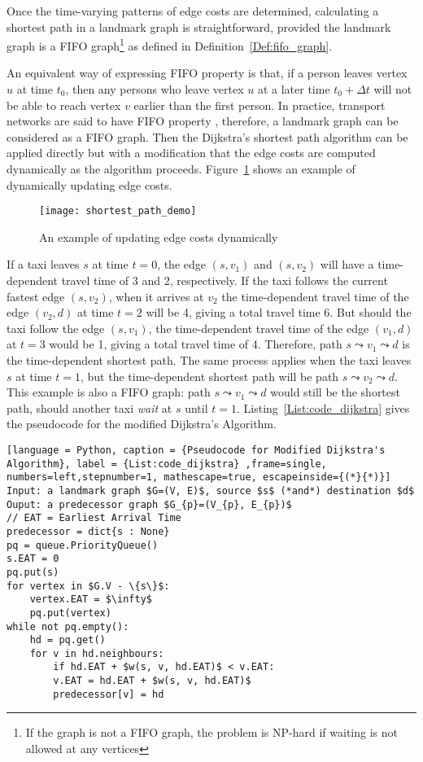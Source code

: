 Once the time-varying patterns of edge costs are determined, calculating a shortest path in a landmark graph is straightforward, provided the landmark graph is a FIFO graph\footnote{If the graph is not a FIFO graph, the problem is NP-hard if waiting is not allowed at any vertices} as defined in Definition~\ref{Def:fifo_graph}. 

An equivalent way of expressing FIFO property is that, if a person leaves vertex $u$ at time $t_{0}$, then any persons who leave vertex $u$ at a later time $t_{0} + \Delta t$ will not be able to reach vertex $v$ earlier than the first person. In practice, transport networks are said to have FIFO property \cite{TDR10}, therefore, a landmark graph can be considered as a FIFO graph. Then the Dijkstra's shortest path algorithm can be applied directly but with a modification that the edge costs are computed dynamically as the algorithm proceeds. Figure~\ref{Fig:dynamic_update} shows an example of dynamically updating edge costs. 

\begin{figure}[h!]
\texttt{[image: shortest\_path\_demo]}
\centering
\caption{An example of updating edge costs dynamically}\label{Fig:dynamic_update}
\end{figure}

If a taxi leaves $s$ at time $t = 0$, the edge $(s, v_{1})$ and $(s, v_{2})$ will have a time-dependent travel time of 3 and 2, respectively. If the taxi follows the current fastest edge $(s, v_{2})$, when it arrives at $v_{2}$ the time-dependent travel time of the edge $(v_{2}, d)$ at time $t = 2$ will be 4, giving a total travel time 6. But should the taxi follow the edge $(s, v_{1})$, the time-dependent travel time of the edge $(v_{1}, d)$ at $t = 3$ would be 1, giving a total travel time of 4. Therefore, path $s \leadsto v_{1} \leadsto d$ is the time-dependent shortest path. The same process applies when the taxi leaves $s$ at time $t = 1$, but the time-dependent shortest path will be path $s \leadsto v_{2} \leadsto d$. This example is also a FIFO graph: path $s \leadsto v_{1} \leadsto d$ would still be the shortest path, should another taxi \emph{wait} at $s$ until $t = 1$. Listing~\ref{List:code_dijkstra} gives the pseudocode for the modified Dijkstra's Algorithm. 

\begin{lstlisting}[language = Python, caption = {Pseudocode for Modified Dijkstra's Algorithm}, label = {List:code_dijkstra} ,frame=single, numbers=left,stepnumber=1, mathescape=true, escapeinside={(*}{*)}]
Input: a landmark graph $G=(V, E)$, source $s$ (*and*) destination $d$
Ouput: a predecessor graph $G_{p}=(V_{p}, E_{p})$
// EAT = Earliest Arrival Time
predecessor = dict{s : None}
pq = queue.PriorityQueue()
s.EAT = 0
pq.put(s)
for vertex in $G.V - \{s\}$:
    vertex.EAT = $\infty$
    pq.put(vertex)
while not pq.empty():
    hd = pq.get()
    for v in hd.neighbours:
    	if hd.EAT + $w(s, v, hd.EAT)$ < v.EAT:
	    v.EAT = hd.EAT + $w(s, v, hd.EAT)$
	    predecessor[v] = hd
\end{lstlisting}

